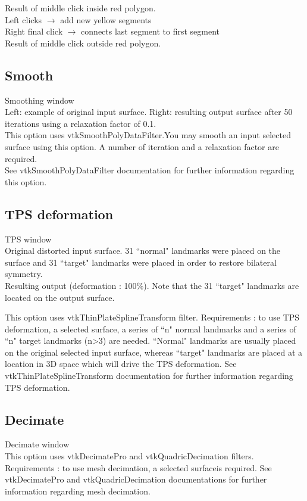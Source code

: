 Result of middle click inside red polygon.\\

Left clicks $\rightarrow$ add new yellow segments\\
Right final click $\rightarrow$ connects last segment to first segment \\

Result of middle click outside red polygon.\\

\subsection{Smooth}
Smoothing window\\

Left: example of original input surface. Right: resulting output surface after 50 iterations using a relaxation factor of 0.1.\\

This option uses vtkSmoothPolyDataFilter.You may smooth an input
selected surface using this option. A number of iteration and a
relaxation factor are required.\\
See vtkSmoothPolyDataFilter documentation for further information regarding this option.

\subsection{TPS deformation}
TPS window\\
Original distorted input surface. 31 ``normal"
landmarks were placed on the surface and 31
``target" landmarks were placed in order to
restore bilateral symmetry.\\
Resulting output (deformation : 100\%). Note
that the 31 ``target" landmarks are located on
the output surface.




This option uses vtkThinPlateSplineTransform filter.
Requirements : to use TPS deformation, a selected surface,
a series of ``n" normal landmarks and a series of ``n"
target landmarks (n>3) are needed. ``Normal" landmarks
are usually placed on the original selected input surface,
whereas ``target" landmarks are placed at a location in 3D
space which will drive the TPS deformation. See vtkThinPlateSplineTransform documentation for further information regarding TPS deformation.

\subsection{Decimate}
Decimate window\\
This option uses vtkDecimatePro and
vtkQuadricDecimation filters.
Requirements : to use mesh decimation, a selected
surfaceis required.
See vtkDecimatePro and vtkQuadricDecimation documentations for further information regarding
mesh decimation.\\

